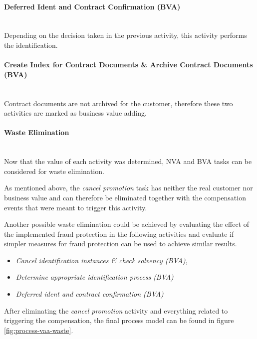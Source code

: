 \paragraph{Deferred Ident and Contract Confirmation (BVA)}~\\ 
Depending on the decision taken in the previous activity, this activity performs the identification. 
\paragraph{Create Index for Contract Documents \& Archive Contract Documents (BVA)}~\\ 
Contract documents are not archived for the customer, therefore these two activities are marked as business value adding.

\paragraph{Waste Elimination}~\\
Now that the value of each activity was determined, NVA and BVA tasks can be considered for waste elimination.

As mentioned above, the \textit{cancel promotion} task has neither the real customer nor business value and can therefore be eliminated together with the compensation events that were meant to trigger this activity. 

Another possible waste elimination could be achieved by evaluating the effect of the implemented fraud protection in the following activities and evaluate if simpler measures for fraud protection can be used to achieve similar results.
\begin{itemize}
	\item \textit{Cancel identification  instances \& check solvency (BVA)}, 
	\item \textit{{Determine appropriate identification process (BVA)}} 
	\item \textit{Deferred ident and contract confirmation (BVA)}
\end{itemize}

After eliminating the \textit{cancel promotion} activity and everything related to triggering the compensation, the final process model can be found in figure \ref{fig:process-vaa-waste}.